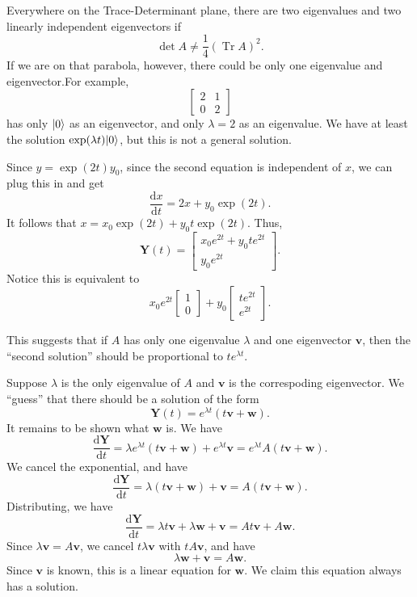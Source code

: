 
Everywhere on the Trace-Determinant plane, there are two eigenvalues and two linearly independent eigenvectors if
 \[
	\det A \neq \frac{1}{4}\left( \operatorname{Tr }A \right) ^2
.\]
If we are on that parabola, however, there could be only one eigenvalue and eigenvector.For example,
\[
	\begin{bmatrix} 2&1 \\ 0&2 \end{bmatrix} 
\]
has only $\lvert0\rangle$ as an eigenvector, and only $\lambda =2$ as an eigenvalue. We have at least the solution $\exp (\lambda t)\lvert0\rangle$, but this is not a general solution.

Since $y=\exp (2t)y_0$, since the second equation is independent of $x$, we can plug this in and get
\[
	\frac{\mathrm{d}x}{\mathrm{d}t} =2x+y_0\exp(2t)
.\]
It follows that $x=x_0 \exp (2t)+y_0t\exp (2t)$. Thus,
\[
	\mathbf{Y}(t)=\begin{bmatrix} x_0 e^{2t}+y_0te ^{2t} \\ y_0e^{2t} \end{bmatrix} 
.\]
Notice this is equivalent to
\[
	x_0 e^{2t}\begin{bmatrix} 1 \\ 0 \end{bmatrix} +y_0 \begin{bmatrix} t e^{2t} \\ e^{2t} \end{bmatrix} 
.\]

This suggests that if $A$ has only one eigenvalue $\lambda $ and one eigenvector $\mathbf{v}$, then the ``second solution'' should be proportional to $t e^{\lambda t}$.

Suppose $\lambda $ is the only eigenvalue of $A$ and $\mathbf{v}$ is the correspoding eigenvector. We ``guess'' that there should be a solution of the form
\[
	\mathbf{Y}(t)=e^{\lambda t}(t\mathbf{v}+\mathbf{w})
.\]
It remains to be shown what $\mathbf{w}$ is. We have
\[
	\frac{\mathrm{d}\mathbf{Y}}{\mathrm{d}t} =\lambda e^{\lambda t}(t \mathbf{v}+\mathbf{w})+e^{\lambda t}\mathbf{v}=e^{\lambda t}A(t \mathbf{v}+\mathbf{w})
.\]
We cancel the exponential, and have
\[
	\frac{\mathrm{d}\mathbf{Y}}{\mathrm{d}t} =\lambda (t \mathbf{v}+\mathbf{w})+\mathbf{v}=A(t \mathbf{v}+\mathbf{w})
.\]
Distributing, we have
\[
	\frac{\mathrm{d}\mathbf{Y}}{\mathrm{d}t} =\lambda t \mathbf{v}+\lambda  \mathbf{w}+\mathbf{v}=At \mathbf{v}+A \mathbf{w}
.\]
Since $\lambda  \mathbf{v}=A \mathbf{v}$, we cancel $t \lambda \mathbf{v}$ with $tA \mathbf{v}$, and have
\[
	\lambda \mathbf{w}+\mathbf{v}=A \mathbf{w}
.\]
Since $\mathbf{v}$ is known, this is a linear equation for $\mathbf{w}$. We claim this equation always has a solution.

